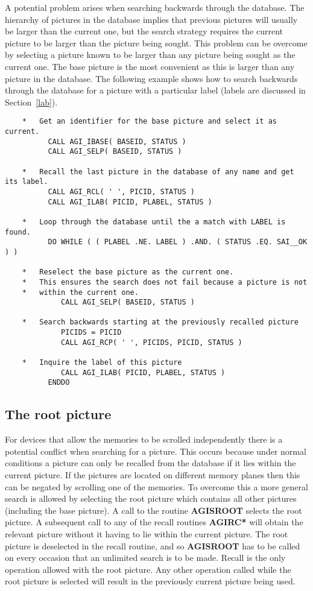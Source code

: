 \documentclass[twoside,11pt]{article}
\newcommand{\hyperref}[4]{#2\ref{#4}#3}
\newcommand{\htmlref}[2]{#1}
\renewcommand{\_}{\texttt{\symbol{95}}}
\begin{document}
A potential problem arises when searching backwards through the database.
The hierarchy of pictures in the database implies that previous pictures
will usually be larger than the current one, but the search strategy
requires the current picture to be larger than the picture being sought.
This problem can be overcome by selecting a picture known to be larger
than any picture being sought as the current one. The base picture is
the most convenient as this is larger than any picture in the database.
The following example shows how to search backwards through the database
for a picture with a particular label (labels are discussed in 
\hyperref{this section}{Section~}{}{lab}).
\begin{verbatim}
    *   Get an identifier for the base picture and select it as current.
          CALL AGI_IBASE( BASEID, STATUS )
          CALL AGI_SELP( BASEID, STATUS )

    *   Recall the last picture in the database of any name and get its label.
          CALL AGI_RCL( ' ', PICID, STATUS )
          CALL AGI_ILAB( PICID, PLABEL, STATUS )

    *   Loop through the database until the a match with LABEL is found.
          DO WHILE ( ( PLABEL .NE. LABEL ) .AND. ( STATUS .EQ. SAI__OK ) )

    *   Reselect the base picture as the current one.
    *   This ensures the search does not fail because a picture is not
    *   within the current one.
             CALL AGI_SELP( BASEID, STATUS )

    *   Search backwards starting at the previously recalled picture
             PICIDS = PICID
             CALL AGI_RCP( ' ', PICIDS, PICID, STATUS )

    *   Inquire the label of this picture
             CALL AGI_ILAB( PICID, PLABEL, STATUS )
          ENDDO
\end{verbatim}

\subsection{The root picture}
For devices that allow the memories to be scrolled independently there is
a potential conflict when searching for a picture. This occurs because
under normal conditions a picture can only be recalled from the database
if it lies within the current picture. If the pictures are located on
different memory planes then this can be negated by scrolling one of the
memories. To overcome this a more general search is allowed by selecting
the root picture which contains all other pictures (including the base
picture). A call to the routine 
\htmlref{{\bf AGI\_SROOT}}{AGI_SROOT} selects the root
picture. A subsequent call to any of the recall routines {\bf AGI\_RC*}
will obtain the relevant picture without it having to lie within the
current picture. The root picture is deselected in the recall routine, and
so {\bf AGI\_SROOT} has to be called on every occasion that an unlimited
search is to be made. Recall is the only operation allowed with the root
picture. Any other operation called while the root picture is selected
will result in the previously current picture being used.
\end{document}
